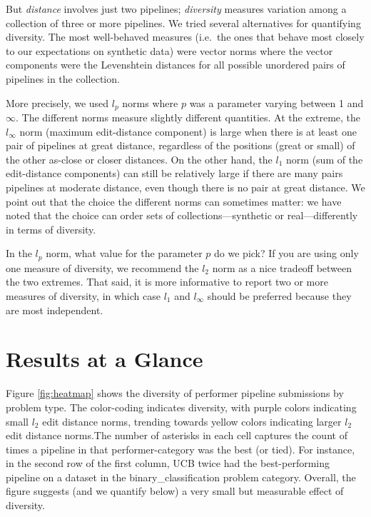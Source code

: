 \documentclass{article}
\begin{document}
But \emph{distance} involves just two pipelines; \emph{diversity} measures variation
among a collection of three or more pipelines.  We tried several
alternatives for quantifying diversity.  The most well-behaved
measures (i.e.\ the ones that behave most closely to our expectations
on synthetic data) were vector norms where the vector components were
the Levenshtein distances for all possible unordered pairs of
pipelines in the collection.

More precisely, we used $l_p$ norms where $p$ was a parameter varying
between 1 and $\infty$.  The different norms measure slightly different
quantities.  At the extreme, the $l_\infty$ norm (maximum
edit-distance component) is large when there is at least one pair of
pipelines at great distance, regardless of the positions (great or
small) of the other as-close or closer distances.  On the other hand,
the $l_1$ norm (sum of the edit-distance components) can still be
relatively large if there are many pairs pipelines at moderate
distance, even though there is no pair at great distance.  We point
out that the choice the different norms can sometimes matter: we have
noted that the choice can order sets of collections---synthetic or
real---differently in terms of diversity.


In the $l_p$ norm, what value for the parameter $p$ do we pick?  If
you are using only one measure of diversity, we recommend the $l_2$
norm as a nice tradeoff between the two extremes.  That said, it is
more informative to report two or more measures of diversity, in which
case $l_1$ and $l_\infty$ should be preferred because they are most
independent.

\section{Results at a Glance}
\label{sec:glance}
Figure \ref{fig:heatmap} shows the diversity of performer pipeline submissions by problem type. The color-coding indicates diversity, with purple colors indicating small $l_2$ edit distance norms, trending towards yellow colors indicating larger $l_2$ edit distance norms.The number of asterisks in each cell captures the count of times a pipeline in that performer-category was the best (or tied). For instance, in the second row of the first column, UCB twice had the best-performing pipeline on a dataset in the binary\_classification problem category. Overall, the figure suggests (and we quantify below) a very small but measurable effect of diversity.
\end{document}
